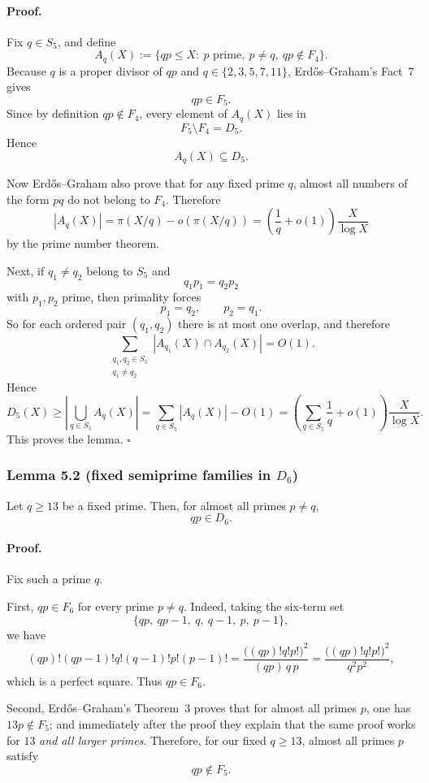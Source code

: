 \paragraph{Proof.}
Fix $q\in S_5$, and define
\[
A_q(X):=\{qp\le X:\ p \text{ prime},\ p\neq q,\ qp\notin F_4\}.
\]
Because $q$ is a proper divisor of $qp$ and $q\in\{2,3,5,7,11\}$, Erd\H{o}s--Graham's Fact~7 gives
\[
qp\in F_5.
\]
Since by definition $qp\notin F_4$, every element of $A_q(X)$ lies in
\[
F_5\setminus F_4=D_5.
\]
Hence
\[
A_q(X)\subseteq D_5.
\]

Now Erd\H{o}s--Graham also prove that for any fixed prime $q$, almost all numbers of the form $pq$ do not belong to $F_4$.
Therefore
\[
|A_q(X)|=\pi(X/q)-o(\pi(X/q))
      =\left(\frac1q+o(1)\right)\frac{X}{\log X}
\]
by the prime number theorem.

Next, if $q_1\neq q_2$ belong to $S_5$ and
\[
q_1p_1=q_2p_2
\]
with $p_1,p_2$ prime, then primality forces
\[
p_1=q_2,\qquad p_2=q_1.
\]
So for each ordered pair $(q_1,q_2)$ there is at most one overlap, and therefore
\[
\sum_{\substack{q_1,q_2\in S_5\\ q_1\neq q_2}} |A_{q_1}(X)\cap A_{q_2}(X)| = O(1).
\]
Hence
\[
D_5(X)\ge \left|\bigcup_{q\in S_5} A_q(X)\right|
       = \sum_{q\in S_5}|A_q(X)| - O(1)
       = \left(\sum_{q\in S_5}\frac1q+o(1)\right)\frac{X}{\log X}.
\]
This proves the lemma. \hfill$\square$

\subsubsection*{Lemma 5.2 (fixed semiprime families in $D_6$)}
Let $q\ge 13$ be a fixed prime. Then, for almost all primes $p\neq q$,
\[
qp\in D_6.
\]

\paragraph{Proof.}
Fix such a prime $q$.

First, $qp\in F_6$ for every prime $p\neq q$.
Indeed, taking the six-term set
\[
\{qp,\ qp-1,\ q,\ q-1,\ p,\ p-1\},
\]
we have
\[
(qp)!(qp-1)!q!(q-1)!p!(p-1)!
=
\frac{\big((qp)!q!p!\big)^2}{(qp)\,q\,p}
=
\frac{\big((qp)!q!p!\big)^2}{q^2p^2},
\]
which is a perfect square.
Thus $qp\in F_6$.

Second, Erd\H{o}s--Graham's Theorem~3 proves that for almost all primes $p$, one has $13p\notin F_5$;
and immediately after the proof they explain that the same proof works for $13$ \emph{and all larger primes}.
Therefore, for our fixed $q\ge 13$, almost all primes $p$ satisfy
\[
qp\notin F_5.
\]

